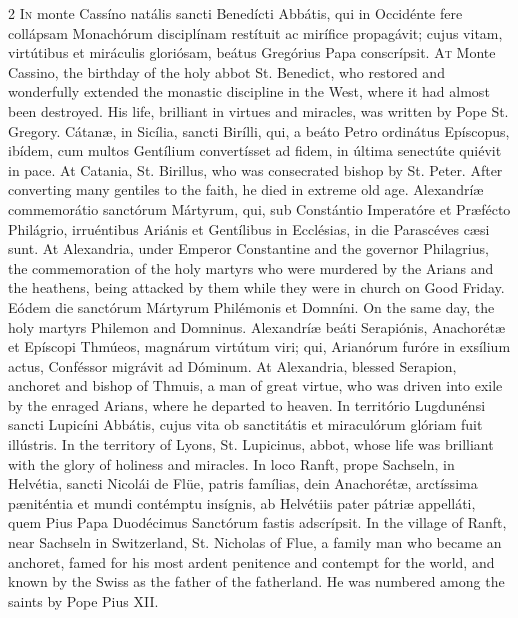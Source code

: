 \begin{paracol}{2}
\lettrine[lines=2]{I}{n} monte Cassíno natális sancti Benedícti Abbátis, qui in Occidénte fere 
 collápsam Monachórum disciplínam restítuit ac mirífice propagávit; cujus 
 vitam, virtútibus et miráculis gloriósam, beátus Gregórius Papa conscrípsit.
\switchcolumn
{}
\lettrine[lines=2]{A}{t} Monte Cassino, the birthday of the holy abbot St. Benedict, who restored 
 and wonderfully extended the monastic discipline in the West, where it had 
 almost been destroyed. His life, brilliant in virtues and miracles, 
 was written by Pope St. Gregory.
\switchcolumn*
{}
Cátanæ, in Sicília, sancti Birílli, qui, a 
 beáto Petro ordinátus Epíscopus, ibídem, cum multos Gentílium convertísset 
 ad fidem, in última senectúte quiévit in pace.
\switchcolumn
{}
At Catania, St. Birillus, who was consecrated bishop by St. Peter. 
 After converting many gentiles to the faith, he died in extreme old age.
\switchcolumn*
{}
Alexandríæ commemorátio sanctórum Mártyrum, 
 qui, sub Constántio Imperatóre et Præfécto Philágrio, irruéntibus Ariánis et 
 Gentílibus in Ecclésias, in die Parascéves cæsi sunt.
\switchcolumn
{}
At Alexandria, under Emperor Constantine and the governor Philagrius, the 
 commemoration of the holy martyrs who were murdered by the Arians and the 
 heathens, being attacked by them while they were in church on Good Friday.
\switchcolumn*
{}
Eódem die sanctórum Mártyrum Philémonis et 
 Domníni.
\switchcolumn
{}
On the same day, the holy martyrs Philemon and Domninus.
\switchcolumn*
{}
Alexandríæ beáti Serapiónis, Anachorétæ et 
 Epíscopi Thmúeos, magnárum virtútum viri; qui, Arianórum furóre in exsílium 
 actus, Conféssor migrávit ad Dóminum.
\switchcolumn
{}
At Alexandria, blessed Serapion, anchoret and bishop of Thmuis, a man of 
 great virtue, who was driven into exile by the enraged Arians, where he 
 departed to heaven.
\switchcolumn*
{}
In território Lugdunénsi sancti Lupicíni Abbátis, cujus vita ob sanctitátis 
 et miraculórum glóriam fuit illústris.
\switchcolumn
{}
In the territory of Lyons, St. Lupicinus, abbot, whose life was brilliant 
 with the glory of holiness and miracles.
\switchcolumn*
{}
In loco Ranft, prope Sachseln, in Helvétia, sancti Nicolái de Flüe, 
 patris famílias, dein Anachorétæ, arctíssima pæniténtia et mundi contémptu 
 insígnis, ab Helvétiis pater pátriæ appelláti, quem Pius Papa Duodécimus 
 Sanctórum fastis adscrípsit.
\switchcolumn
{}
In the village of Ranft, near Sachseln in Switzerland, St. Nicholas of Flue, 
 a family man who became an anchoret, famed for his most ardent penitence and 
 contempt for the world, and known by the Swiss as the father of the 
 fatherland. He was numbered among the saints by Pope Pius XII.
\switchcolumn*
{}
\end{paracol}


